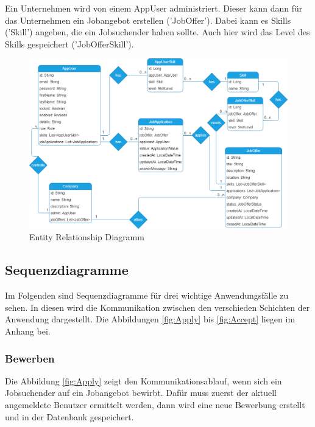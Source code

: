 \documentclass[12pt, letterpaper]{article}
\begin{document}
    Ein Unternehmen wird von einem AppUser administriert. Dieser kann dann für das Unternehmen ein Jobangebot erstellen ('JobOffer'). Dabei kann es Skills ('Skill') angeben, die ein Jobsuchender
    haben sollte. Auch hier wird das Level des Skills gespeichert ('JobOfferSkill').
    \\[4mm]
    \begin{figure}[htbp]
        \includegraphics[width = \linewidth]{ERM.png}
        \caption{Entity Relationship Diagramm}
        \label{fig:ERM}
    \end{figure}
    

    \subsection{Sequenzdiagramme}
    
    Im Folgenden sind Sequenzdiagramme für drei wichtige Anwendungsfälle zu sehen. In diesen wird die Kommunikation zwischen
    den verschieden Schichten der Anwendung dargestellt. Die Abbildungen \ref{fig:Apply} bis \ref{fig:Accept} liegen im Anhang bei.

    \subsubsection{Bewerben}

    Die Abbildung \ref{fig:Apply} zeigt den Kommunikationsablauf, wenn sich ein Jobsuchender auf ein Jobangebot bewirbt. Dafür muss zuerst
    der aktuell angemeldete Benutzer ermittelt werden, dann wird eine neue Bewerbung erstellt und in der Datenbank gespeichert.
\end{document}
